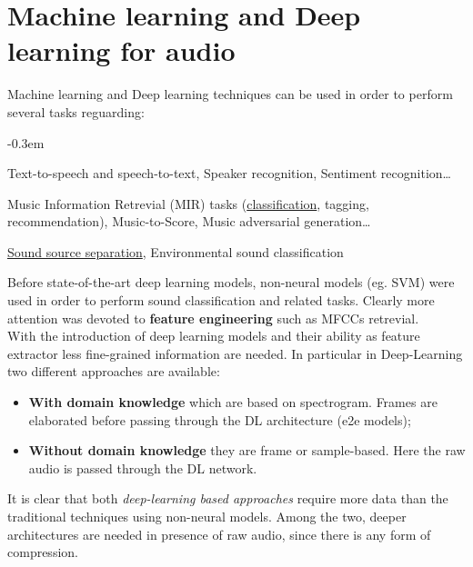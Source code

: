 \section{Machine learning and Deep learning for audio}
Machine learning and Deep learning techniques can be used in order to perform several tasks reguarding: 
\begin{description}
    \itemsep-0.3em
    \item[Speech] Text-to-speech and speech-to-text, Speaker recognition, Sentiment recognition\dots
    \item[Music] Music Information Retrevial (MIR) tasks (\underline{classification}, tagging, recommendation), Music-to-Score, Music adversarial generation\dots
    \item[Audio] \underline{Sound source separation}, Environmental sound classification
\end{description}
Before state-of-the-art deep learning models, non-neural models (eg. SVM) were used in order to perform sound classification and related tasks. Clearly more attention was devoted to \textbf{feature engineering} such as MFCCs retrevial.\\
 With the introduction of deep learning models and their ability as feature extractor less fine-grained information are needed. In particular in Deep-Learning two different approaches are available:
 \begin{itemize}
    \itemsep-0.3em
    \item \textbf{With domain knowledge} which are based on spectrogram. Frames are elaborated before passing through the DL architecture (e2e models);
    \item \textbf{Without domain knowledge} they are frame or sample-based. Here the raw audio is passed through the DL network. 
 \end{itemize}

 It is clear that both \textit{deep-learning based approaches} require more data than the traditional techniques using non-neural models. Among the two, deeper architectures are needed in presence of raw audio, since there is any form of compression.

